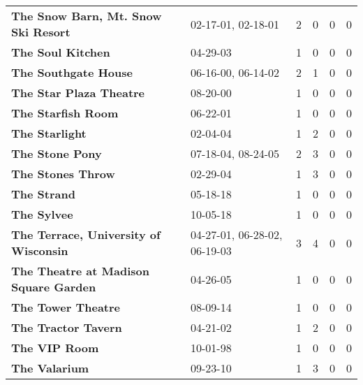 \begin{supertabular}{llllll}
                          \textbf{The Snow Barn, Mt. Snow Ski Resort} &            02-17-01, 02-18-01 &  2 &   0 &  0 &  0 \\
                                            \textbf{The Soul Kitchen} &                      04-29-03 &  1 &   0 &  0 &  0 \\
                                         \textbf{The Southgate House} &            06-16-00, 06-14-02 &  2 &   1 &  0 &  0 \\
                                      \textbf{The Star Plaza Theatre} &                      08-20-00 &  1 &   0 &  0 &  0 \\
                                           \textbf{The Starfish Room} &                      06-22-01 &  1 &   0 &  0 &  0 \\
                                               \textbf{The Starlight} &                      02-04-04 &  1 &   2 &  0 &  0 \\
                                              \textbf{The Stone Pony} &            07-18-04, 08-24-05 &  2 &   3 &  0 &  0 \\
                                            \textbf{The Stones Throw} &                      02-29-04 &  1 &   3 &  0 &  0 \\
                                                  \textbf{The Strand} &                      05-18-18 &  1 &   0 &  0 &  0 \\
                                                  \textbf{The Sylvee} &                      10-05-18 &  1 &   0 &  0 &  0 \\
                        \textbf{The Terrace, University of Wisconsin} &  04-27-01, 06-28-02, 06-19-03 &  3 &   4 &  0 &  0 \\
                        \textbf{The Theatre at Madison Square Garden} &                      04-26-05 &  1 &   0 &  0 &  0 \\
                                           \textbf{The Tower Theatre} &                      08-09-14 &  1 &   0 &  0 &  0 \\
                                          \textbf{The Tractor Tavern} &                      04-21-02 &  1 &   2 &  0 &  0 \\
                                                \textbf{The VIP Room} &                      10-01-98 &  1 &   0 &  0 &  0 \\
                                                \textbf{The Valarium} &                      09-23-10 &  1 &   3 &  0 &  0 \\

\end{supertabular}

